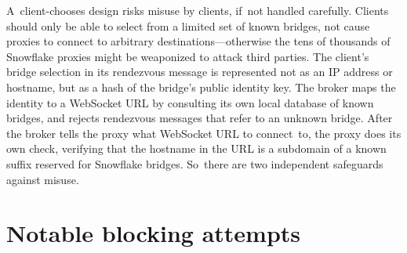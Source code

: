 \documentclass[letterpaper,twocolumn]{article}
\begin{document}
A~client-chooses design risks
misuse by clients, if~not handled carefully.
Clients should only be able to select from
a limited set of known bridges,
not cause proxies to connect to arbitrary destinations---otherwise
the tens of thousands of Snowflake proxies might be weaponized
to attack third parties.
The client's bridge selection
in its rendezvous message is represented
not as an IP address or hostname,
but as a hash of the bridge's public identity key.
The broker maps the identity to a WebSocket URL
by consulting its own local database of known bridges,
and rejects rendezvous messages that refer to an unknown bridge.
After the broker tells the proxy what WebSocket URL to connect~to,
the proxy does its own check,
verifying that the hostname in the URL is a subdomain of
a known suffix reserved for Snowflake bridges.
So~there are two independent safeguards against misuse.


\section{Notable blocking attempts}
\label{sec:block}
\end{document}
